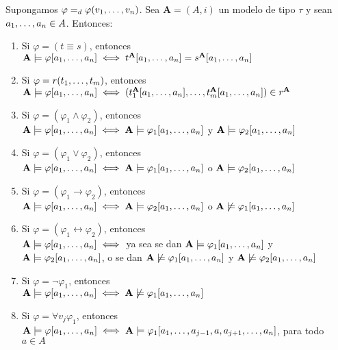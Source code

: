 \begin{lemma}
  Supongamos $\varphi =_d \varphi(v_{1}, \dots, v_{n})$. Sea $\mathbf{A} = (A, i)$ un modelo de tipo $\tau$
  y sean $a_{1}, \dots, a_{n} \in A$. Entonces: \begin{enumerate}
    \item Si $\varphi = (t \equiv s)$, entonces \\$\mathbf{A}\models\varphi[a_{1}, \dots, a_{n}] \iff t^\mathbf{A}[a_{1}, \dots, a_{n}] = s^\mathbf{A}[a_{1}, \dots, a_{n}]$
    \item Si $\varphi = r(t_{1}, \dots, t_{m})$, entonces \\$\mathbf{A}\models\varphi[a_{1}, \dots, a_{n}] \iff (t_1^\mathbf{A}[a_{1}, \dots, a_{n}],\dots,t_m^\mathbf{A}[a_{1}, \dots, a_{n}]) \in r^\mathbf{A}$
    \item Si $\varphi = (\varphi_1 \land \varphi_2)$, entonces \\$\mathbf{A}\models\varphi[a_{1}, \dots, a_{n}] \iff \mathbf{A}\models\varphi_1[a_{1}, \dots, a_{n}]$ y $\mathbf{A}\models\varphi_2[a_{1}, \dots, a_{n}]$
    \item Si $\varphi = (\varphi_1 \lor \varphi_2)$, entonces \\$\mathbf{A}\models\varphi[a_{1}, \dots, a_{n}] \iff \mathbf{A}\models\varphi_1[a_{1}, \dots, a_{n}]$ o $\mathbf{A}\models\varphi_2[a_{1}, \dots, a_{n}]$
    \item Si $\varphi = (\varphi_1 \rightarrow \varphi_2)$, entonces \\$\mathbf{A}\models\varphi[a_{1}, \dots, a_{n}] \iff \mathbf{A}\models\varphi_2[a_{1}, \dots, a_{n}]$ o $\mathbf{A}\not\models\varphi_1[a_{1}, \dots, a_{n}]$
    \item Si $\varphi = (\varphi_1 \leftrightarrow \varphi_2)$, entonces \\$\mathbf{A}\models\varphi[a_{1}, \dots, a_{n}] \iff$ ya sea se dan $\mathbf{A}\models\varphi_1[a_{1}, \dots, a_{n}]$ y $\mathbf{A}\models\varphi_2[a_{1}, \dots, a_{n}]$, o se dan $\mathbf{A}\not\models\varphi_1[a_{1}, \dots, a_{n}]$ y $\mathbf{A}\not\models\varphi_2[a_{1}, \dots, a_{n}]$
    \item Si $\varphi = \neg\varphi_1$, entonces\\$\mathbf{A}\models\varphi[a_{1}, \dots, a_{n}] \iff \mathbf{A}\not\models\varphi_1[a_{1}, \dots, a_{n}]$
    \item Si $\varphi = \forall v_j \varphi_1$, entonces \\$\mathbf{A}\models\varphi[a_{1}, \dots, a_{n}] \iff \mathbf{A}\models\varphi_1[a_{1}, \dots, a_{j-1},a,a_{j+1}, \dots, a_{n}]$, para todo $a \in A$

\end{enumerate}
\end{lemma}
